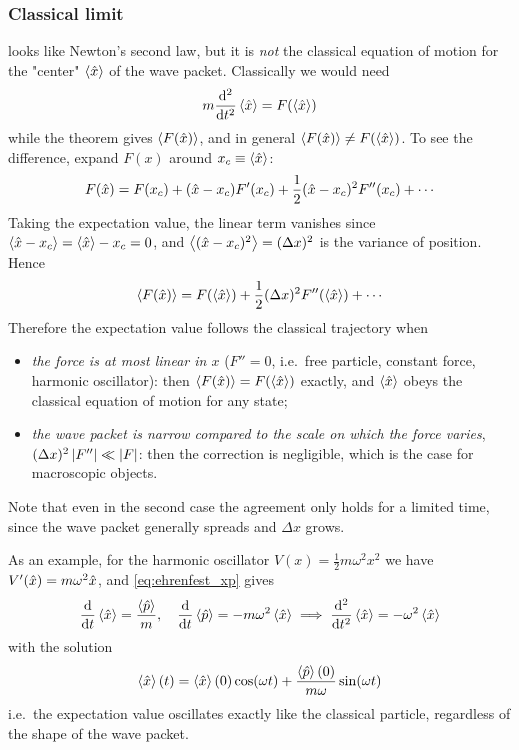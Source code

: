 \subsubsection{Classical limit}
 looks like Newton's second law, but it is \emph{not} the classical equation of motion for the "center" $\left\langle \hat{x} \right\rangle$ of the wave packet. Classically we would need
\begin{align*}
    m \frac{\mathrm{d}^2 }{\mathrm{d} t ^2} \left\langle \hat{x} \right\rangle = F(\left\langle \hat{x} \right\rangle)
\end{align*}
while the theorem gives $\left\langle F(\hat{x}) \right\rangle$, and in general $\left\langle F(\hat{x}) \right\rangle \neq F(\left\langle \hat{x} \right\rangle)$. To see the difference, expand $F(x)$ around $x_c \equiv \left\langle \hat{x} \right\rangle$:
\begin{align*}
    F(\hat{x}) = F(x_c) + (\hat{x} - x_c) F'(x_c) + \frac{1}{2} (\hat{x} - x_c)^2 F''(x_c) + \cdots
\end{align*}
Taking the expectation value, the linear term vanishes since $\left\langle \hat{x} - x_c \right\rangle = \left\langle \hat{x} \right\rangle - x_c = 0$, and $\left\langle (\hat{x} - x_c)^2 \right\rangle = (\Delta x)^2$ is the variance of position. Hence
\begin{align*}
    \left\langle F(\hat{x}) \right\rangle = F(\left\langle \hat{x} \right\rangle) + \frac{1}{2} (\Delta x)^2 F''(\left\langle \hat{x} \right\rangle) + \cdots
\end{align*}
Therefore the expectation value follows the classical trajectory when
\begin{itemize}
    \item \emph{the force is at most linear in $x$} ($F'' = 0$, i.e.\ free particle, constant force, harmonic oscillator): then $\left\langle F(\hat{x}) \right\rangle = F(\left\langle \hat{x} \right\rangle)$ exactly, and $\left\langle \hat{x} \right\rangle$ obeys the classical equation of motion for any state;
    \item \emph{the wave packet is narrow compared to the scale on which the force varies}, $(\Delta x)^2 \left| F'' \right| \ll \left| F \right|$: then the correction is negligible, which is the case for macroscopic objects.
\end{itemize}
Note that even in the second case the agreement only holds for a limited time, since the wave packet generally spreads and $\Delta x$ grows.

As an example, for the harmonic oscillator $V(x) = \frac{1}{2} m \omega^2 x^2$ we have $V'(\hat{x}) = m \omega^2 \hat{x}$, and \cref{eq:ehrenfest_xp} gives
\begin{align*}
    \frac{\mathrm{d}}{\mathrm{d} t} \left\langle \hat{x} \right\rangle = \frac{\left\langle \hat{p} \right\rangle}{m}, \quad \frac{\mathrm{d}}{\mathrm{d} t} \left\langle \hat{p} \right\rangle = - m \omega^2 \left\langle \hat{x} \right\rangle \implies \frac{\mathrm{d}^2 }{\mathrm{d} t ^2} \left\langle \hat{x} \right\rangle = - \omega^2 \left\langle \hat{x} \right\rangle
\end{align*}
with the solution
\begin{align*}
    \left\langle \hat{x} \right\rangle(t) = \left\langle \hat{x} \right\rangle(0) \cos(\omega t) + \frac{\left\langle \hat{p} \right\rangle(0)}{m \omega} \sin(\omega t)
\end{align*}
i.e.\ the expectation value oscillates exactly like the classical particle, regardless of the shape of the wave packet.


















